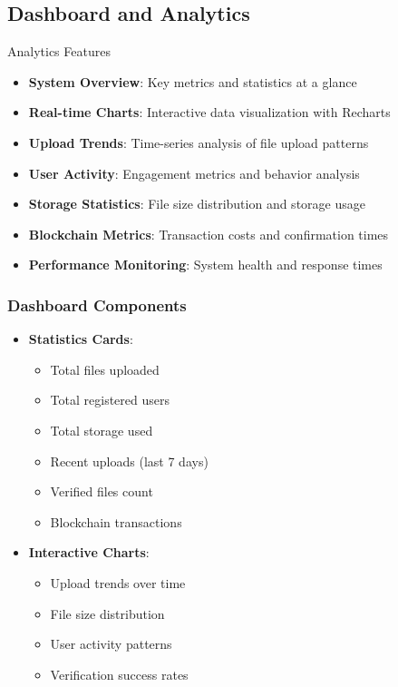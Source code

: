 \documentclass[11pt,a4paper]{article}
\begin{document}
\subsection{Dashboard and Analytics}

\begin{featurebox}{\faChartBar\space Analytics Features}
\begin{itemize}
    \item \textbf{System Overview}: Key metrics and statistics at a glance
    \item \textbf{Real-time Charts}: Interactive data visualization with Recharts
    \item \textbf{Upload Trends}: Time-series analysis of file upload patterns
    \item \textbf{User Activity}: Engagement metrics and behavior analysis
    \item \textbf{Storage Statistics}: File size distribution and storage usage
    \item \textbf{Blockchain Metrics}: Transaction costs and confirmation times
    \item \textbf{Performance Monitoring}: System health and response times
\end{itemize}
\end{featurebox}

\subsubsection{Dashboard Components}
\begin{itemize}
    \item \textbf{Statistics Cards}:
    \begin{itemize}
        \item Total files uploaded
        \item Total registered users
        \item Total storage used
        \item Recent uploads (last 7 days)
        \item Verified files count
        \item Blockchain transactions
    \end{itemize}
    \item \textbf{Interactive Charts}:
    \begin{itemize}
        \item Upload trends over time
        \item File size distribution
        \item User activity patterns
        \item Verification success rates
    \end{itemize}
\end{itemize}
\end{document}
